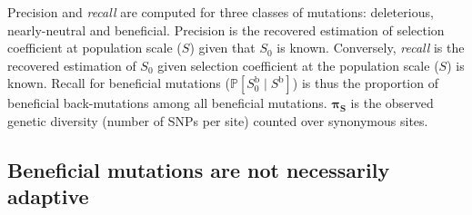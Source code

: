 \documentclass{article}
\newcommand{\proba}{\mathbb{P}}
\newcommand{\Sphy}{S_{0}}
\newcommand{\given}{\mid}
\newcommand{\Spop}{S}
\begin{document}
\begin{table}[tb]
{            Precision and \textit{recall} are computed for three classes of mutations: deleterious, nearly-neutral and beneficial.
            Precision is the recovered estimation of selection coefficient at population scale ($\Spop$) given that $\Sphy$ is known.
            Conversely, \textit{recall} is the recovered estimation of $\Sphy$ given selection coefficient at the population scale ($\Spop$) is known.
            Recall for beneficial mutations ($\proba [\Sphy^{\text{b}} \given \Spop^{\text{b}}]$) is thus the proportion of beneficial back-mutations among all beneficial mutations.
            $\bm{\pi_{\text{S}}}$ is the observed genetic diversity (number of SNPs per site) counted over synonymous sites.
        }
        \label{table:proba}
    \end{table}

    \subsection*{Beneficial mutations are not necessarily adaptive}
\end{document}

